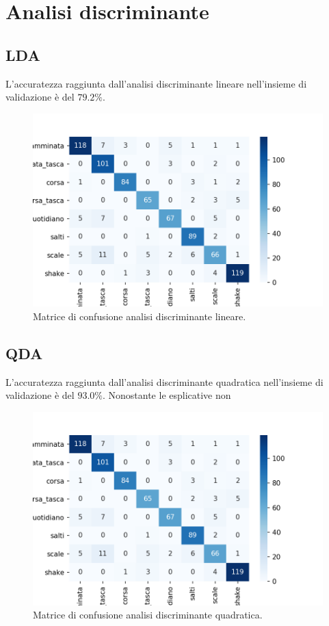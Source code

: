 \documentclass[./main.tex]{subfiles}
\begin{document}
\section{Analisi discriminante}
\subsection*{LDA}
L\rq{}accuratezza raggiunta dall\rq{}analisi discriminante lineare nell\rq{}insieme di validazione è del $79.2\%$.
\begin{figure}[H]
	\centering
	\includegraphics[width=.6\textwidth, keepaspectratio]{../../figure/confusionMatrix-QDA.png}
	\caption{{Matrice di confusione analisi discriminante lineare.}}
	\label{fig:lda}
\end{figure}

\subsection*{QDA}
L\rq{}accuratezza raggiunta dall\rq{}analisi discriminante quadratica nell\rq{}insieme di validazione è del $93.0\%$. Nonostante le esplicative non 
\begin{figure}[H]
	\centering
	\includegraphics[width=.6\textwidth, keepaspectratio]{../../figure/confusionMatrix-QDA.png}
	\caption{{Matrice di confusione analisi discriminante quadratica.}}
	\label{fig:qda}
\end{figure}
\end{document}
